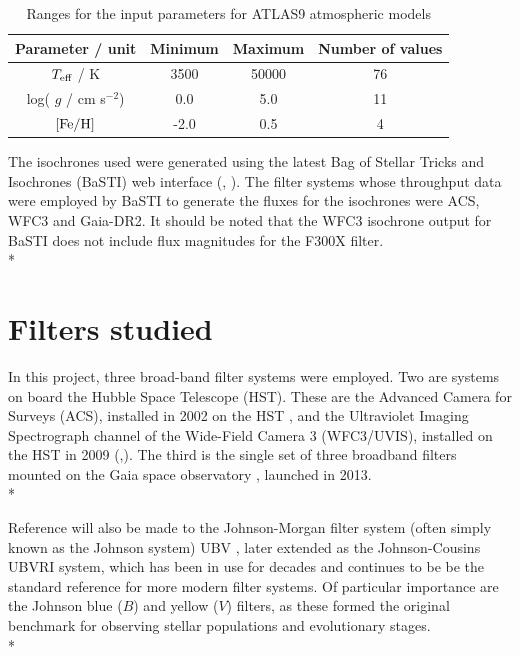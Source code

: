 \documentclass[12pt, a4paper]{report}
\begin{document}
\begin{table}
\begin{center}
\begin{tabular}{cccc}
\hline
Parameter / unit & Minimum & Maximum & Number of values \\
\hline
$T_{\textnormal{eff}}$ / K & 3500 & 50000 & 76 \\
log( $g$ / cm s$^{-2}$) & 0.0 & 5.0 & 11 \\
$\textnormal{[Fe/H]}$ & -2.0 & 0.5 & 4 \\
\hline
\end{tabular}
\caption{Ranges for the input parameters for ATLAS9 atmospheric models}
\label{atlas9_input}
\end{center}
\end{table}

The isochrones used were generated using the latest Bag of Stellar Tricks and Isochrones (BaSTI) web interface (\cite{2004ApJ...612..168P}, \cite{2018ApJ...856..125H}). The filter systems whose throughput data were employed by BaSTI to generate the fluxes for the isochrones were ACS, WFC3 and Gaia-DR2. It should be noted that the WFC3 isochrone output for BaSTI does not include flux magnitudes for the F300X filter.\\*

\section{Filters studied}
In this project, three broad-band filter systems were employed. Two are systems on board the Hubble Space Telescope (HST). These are the Advanced Camera for Surveys (ACS), installed in 2002 on the HST \citep{2007AJ....133.1658S}, and the Ultraviolet Imaging Spectrograph channel of the Wide-Field Camera 3 (WFC3/UVIS), installed on the HST in 2009 (\cite{2010wfc..rept...14K},\cite{2010SPIE.7731E..0ZM}). The third is the single set of three broadband filters mounted on the Gaia space observatory  \citep{2010A&A...523A..48J}, launched in 2013. \\*

Reference will also be made to the Johnson-Morgan filter system (often simply known as the Johnson system) UBV \cite{1953ApJ...117..313J}, later extended as the Johnson-Cousins UBVRI \cite{1990PASP..102.1181B} system, which has been in use for decades and continues to be be the standard reference for more modern filter systems. Of particular importance are the Johnson blue ($B$) and yellow ($V$) filters, as these formed the original benchmark for observing stellar populations and evolutionary stages. \\*
\end{document}
